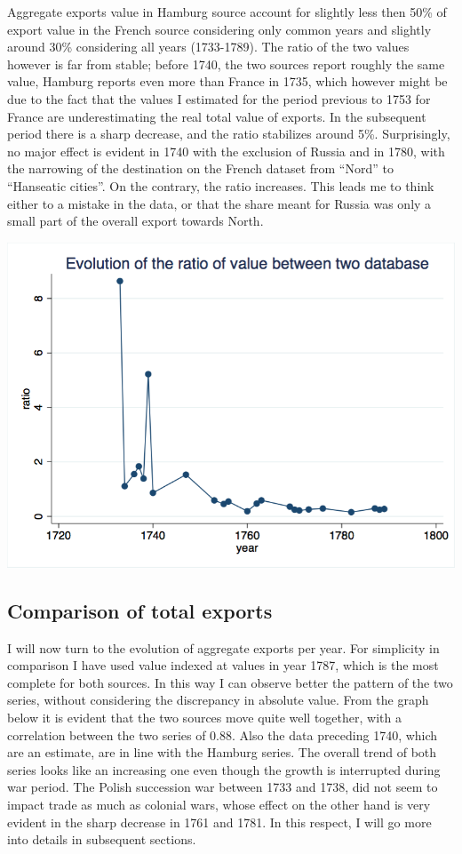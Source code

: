 \documentclass[12pt,a4paper,titlepage,english]{article}
\begin{document}
Aggregate exports value in Hamburg source account for slightly less then 50\% of export value in the French source considering only common years and slightly around 30\% considering all years (1733-1789). The ratio of the two values however is far from stable; before 1740, the two sources report roughly the same value, Hamburg reports even more than France in 1735, which however might be due to the fact that the values I estimated for the period previous to 1753 for France are underestimating the real total value of exports. In the subsequent period there is a sharp decrease, and the ratio stabilizes around 5\%. Surprisingly, no major effect is evident in 1740 with the exclusion of Russia and in 1780, with the narrowing of the destination on the French dataset from “Nord” to “Hanseatic cities”. On the contrary, the ratio increases. This leads me to think either to a mistake in the data, or that the share meant for Russia was only a small part of the overall export towards North.

\begin{center}
\includegraphics[scale=.3]{long_ratio.png}
\end{center}


\subsection{Comparison of total exports}
I will now turn to the evolution of aggregate exports per year.  For simplicity in comparison I have used value indexed at values in year 1787, which is the most complete for both sources. In this way I can observe better  the pattern of the two series, without considering the discrepancy in absolute value. 
From the graph below it is evident that the two sources move quite well together, with a correlation between the two series of 0.88. Also the data preceding 1740, which are an estimate, are in line with the Hamburg series. 
The overall trend of both series looks like an increasing one even though the growth is interrupted during war period. The Polish succession war between 1733 and 1738, did not seem to impact trade as much as colonial wars, whose effect on the other hand is very evident in the sharp decrease in 1761 and 1781. In this respect, I will go more into details in subsequent sections.
\end{document}
